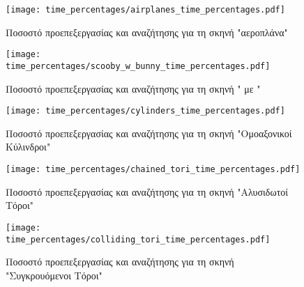 \begin{figure}[h]
    \centering
    \texttt{[image: time\_percentages/airplanes\_time\_percentages.pdf]}
    \caption[Ποσοστά προεπεξεργασίας/αναζήτησης για τη σκηνή "αεροπλάνα"]
    {Ποσοστό προεπεξεργασίας και αναζήτησης για τη σκηνή "αεροπλάνα"}
\end{figure}
\begin{figure}[h]
    \centering
    \texttt{[image: time\_percentages/scooby\_w\_bunny\_time\_percentages.pdf]}
    \caption[Ποσοστά προεπεξεργασίας/αναζήτησης για τη σκηνή " με "]
    {Ποσοστό προεπεξεργασίας και αναζήτησης για τη σκηνή " με "}
\end{figure}
\begin{figure}[h]
    \centering
    \texttt{[image: time\_percentages/cylinders\_time\_percentages.pdf]}
    \caption[Ποσοστά προεπεξεργασίας/αναζήτησης για τη σκηνή "Ομοαξονικοί Κύλινδροι"]
    {Ποσοστό προεπεξεργασίας και αναζήτησης για τη σκηνή "Ομοαξονικοί Κύλινδροι"}
\end{figure}
\begin{figure}[h]
    \centering
    \texttt{[image: time\_percentages/chained\_tori\_time\_percentages.pdf]}
    \caption[Ποσοστά προεπεξεργασίας/αναζήτησης για τη σκηνή "Αλυσιδωτοί Τόροι"]
    {Ποσοστό προεπεξεργασίας και αναζήτησης για τη σκηνή "Αλυσιδωτοί Τόροι"}
\end{figure}
\begin{figure}[h]
    \centering
    \texttt{[image: time\_percentages/colliding\_tori\_time\_percentages.pdf]}
    \caption[Ποσοστά προεπεξεργασίας/αναζήτησης για τη σκηνή "Συγκρουόμενοι Τόροι"]
    {Ποσοστό προεπεξεργασίας και αναζήτησης για τη σκηνή "Συγκρουόμενοι Τόροι"}
\end{figure}








